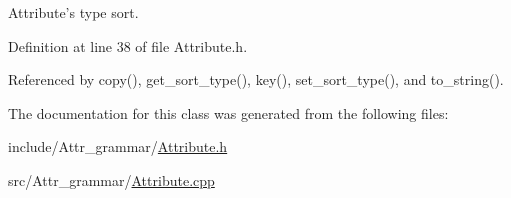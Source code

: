 Attribute's type sort. 



Definition at line 38 of file Attribute.h.

Referenced by copy(), get\_\-sort\_\-type(), key(), set\_\-sort\_\-type(), and to\_\-string().

The documentation for this class was generated from the following files:\begin{CompactItemize}
\item 
include/Attr\_\-grammar/\hyperlink{Attribute_8h}{Attribute.h}\item 
src/Attr\_\-grammar/\hyperlink{Attribute_8cpp}{Attribute.cpp}\end{CompactItemize}
